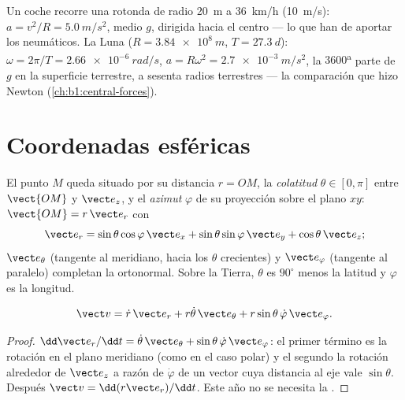 \begin{example}\label{ex:b1:point-kinematics:circles}
Un coche recorre una rotonda de radio \qty{20}{m} a \qty{36}{km/h}
(\qty{10}{m/s}): $a = v^2/R = \qty{5.0}{m/s^2}$, medio $g$, dirigida hacia
el centro --- lo que han de aportar los neumáticos. La Luna
($R = \qty{3.84e8}{m}$, $T = \qty{27.3}{d}$): $\omega = 2\pi/T =
\qty{2.66e-6}{rad/s}$, $a = R\omega^2 = \qty{2.7e-3}{m/s^2}$, la
$3600$\textsuperscript{a} parte de $g$ en la superficie terrestre, a
sesenta radios terrestres --- la comparación que hizo Newton (\cref{ch:b1:central-forces}).
\end{example}

\section{Coordenadas esféricas}

\begin{definition}\label{def:b1:point-kinematics:spherical}
El punto $M$ queda situado por su distancia $r = OM$, la \emph{colatitud}
$\theta \in [0, \pi]$ entre $\vect{OM}$ y $\vect e_z$, y el \emph{azimut}
$\varphi$ de su proyección sobre el plano $xy$:
$\vect{OM} = r\,\vect e_r$ con
\[
\vect e_r = \sin\theta\cos\varphi\,\vect e_x + \sin\theta\sin\varphi\,\vect e_y + \cos\theta\,\vect e_z ;
\]
$\vect e_\theta$ (tangente al meridiano, hacia los $\theta$ crecientes) y
$\vect e_\varphi$ (tangente al paralelo) completan la 
ortonormal. Sobre la Tierra, $\theta$ es $90^\circ$ menos la latitud y
$\varphi$ es la longitud.
\end{definition}

\begin{proposition}\label{prop:b1:point-kinematics:sphericalv}
\[
\vect v = \dot r\,\vect e_r + r\dot\theta\,\vect e_\theta + r\sin\theta\,\dot\varphi\,\vect e_\varphi .
\]
\end{proposition}

\begin{proof}
$\dd\vect e_r/\dd t = \dot\theta\,\vect e_\theta + \sin\theta\,\dot\varphi\,
\vect e_\varphi$: el primer término es la rotación en el plano meridiano
(como en el caso polar) y el segundo la rotación alrededor de $\vect e_z$
a razón de $\dot\varphi$ de un vector cuya distancia al eje vale
$\sin\theta$. Después $\vect v = \dd(r\vect e_r)/\dd t$. Este año no se
necesita la .
\end{proof}

